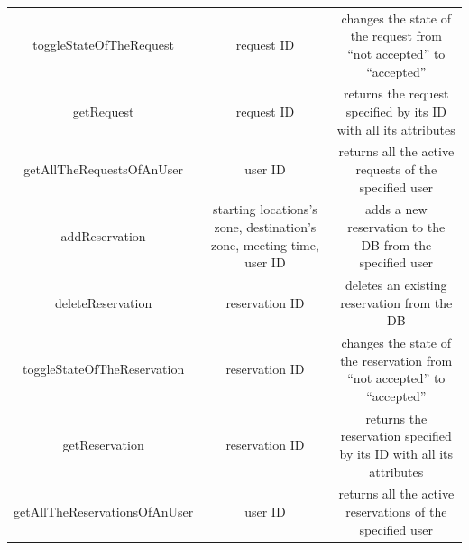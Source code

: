 \documentclass{article}
\begin{document}
\begin{itemize}
\begin{tabular}{*{3}{c}}
			toggleStateOfTheRequest & request ID & changes the state of the request from ``not accepted'' to ``accepted''\\
			getRequest & request ID & returns the request specified by its ID with all its attributes \\
			getAllTheRequestsOfAnUser & user ID & returns all the active requests of the specified user \\
			addReservation & starting locations's zone, destination's zone, meeting time, user ID & adds a new reservation to the DB from the specified user\\
			deleteReservation & reservation ID & deletes an existing reservation from the DB\\
			toggleStateOfTheReservation & reservation ID & changes the state of the reservation from ``not accepted'' to ``accepted''\\
			getReservation & reservation ID & returns the reservation specified by its ID with all its attributes\\
			getAllTheReservationsOfAnUser & user ID & returns all the active reservations of the specified user \\ %
			\bottomrule
		\end{tabular}	
\end{itemize}
\end{document}
